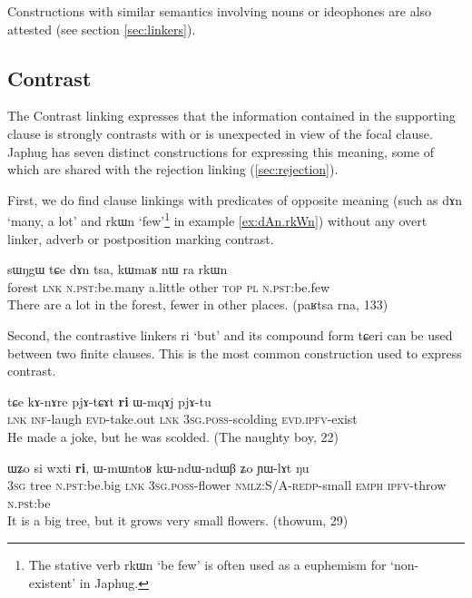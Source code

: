 \documentclass[oldfontcommands,oneside,a4paper,11pt]{article}
\newcommand{\ipa}[1]{{\phon \mbox{#1}}} %
\begin{document}
Constructions with similar semantics involving nouns or ideophones are also attested (see section \ref{sec:linkers}).
 
 
 
 
\subsection{Contrast} \label{sec:contrast}
The Contrast linking expresses that the information contained in the supporting clause is strongly contrasts with or is unexpected in view of the focal clause. Japhug has seven distinct constructions for expressing this meaning, some of which are shared with the rejection linking (\ref{sec:rejection}).

First, we do find  clause linkings with predicates of opposite meaning (such as \ipa{dɤn} `many, a lot' and \ipa{rkɯn} `few'\footnote{The stative verb \ipa{rkɯn} `be few' is often used as a euphemism for `non-existent' in Japhug.} in example \ref{ex:dAn.rkWn}) without any overt linker, adverb or postposition marking contrast.
\begin{exe}
\ex \label{ex:dAn.rkWn}
\gll
 \ipa{sɯŋgɯ}  	\ipa{tɕe}  	\ipa{dɤn}  	\ipa{tsa,}  	\ipa{kɯmaʁ}  	\ipa{nɯ} \ipa{ra}  	\ipa{rkɯn}  \\
 forest \textsc{lnk} \textsc{n.pst}:be.many a.little other \textsc{top} \textsc{pl} \textsc{n.pst}:be.few \\
\glt There are a lot in the forest, fewer in other places. (paʁtsa rna, 133)
\end{exe}

Second, the contrastive linkers \ipa{ri} `but' and its compound form \ipa{tɕeri} can be used between two finite clauses. This is the most common construction used to express contrast.
\begin{exe}
\ex \label{ex:ndAre.mWjmWm}
\gll
\ipa{tɕe}  	\ipa{kɤ-nɤre}  	\ipa{pjɤ-tɕɤt}  	\ipa{\textbf{ri}}  	\ipa{ɯ-mqɤj}  	\ipa{pjɤ-tu}  \\
\textsc{lnk} \textsc{inf}-laugh \textsc{evd}-take.out \textsc{lnk} \textsc{3sg.poss}-scolding
\textsc{evd.ipfv}-exist\\
\glt He made a joke, but he was scolded. (The naughty boy, 22)
\end{exe}

\begin{exe}
\ex \label{ex:wxti.ri}
\gll
\ipa{ɯʑo}    	\ipa{si}    	\ipa{wxti}    	\ipa{\textbf{ri},}    	\ipa{ɯ-mɯntoʁ}    	\ipa{kɯ-ndɯ-ndɯβ}    	\ipa{ʑo}    	\ipa{ɲɯ-lɤt}    	\ipa{ŋu}    \\
\textsc{3sg} tree \textsc{n.pst:}be.big \textsc{lnk} \textsc{3sg.poss}-flower \textsc{nmlz}:S/A-\textsc{redp}-small \textsc{emph} \textsc{ipfv}-throw \textsc{n.ps}t:be\\
\glt It is a big tree, but it grows very small flowers. (thowum, 29)
\end{exe}
\end{document}
